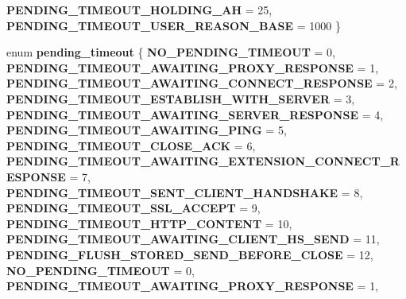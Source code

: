 \begin{DoxyCompactItemize}
{\bfseries P\+E\+N\+D\+I\+N\+G\+\_\+\+T\+I\+M\+E\+O\+U\+T\+\_\+\+H\+O\+L\+D\+I\+N\+G\+\_\+\+AH} = 25, 
\newline
{\bfseries P\+E\+N\+D\+I\+N\+G\+\_\+\+T\+I\+M\+E\+O\+U\+T\+\_\+\+U\+S\+E\+R\+\_\+\+R\+E\+A\+S\+O\+N\+\_\+\+B\+A\+SE} = 1000
 \}
\item 
\mbox{\label{group__timeout_ga2c0aa4b9c3c55bae7b35cbfac3246c87}} 
enum {\bfseries pending\+\_\+timeout} \{ \newline
{\bfseries N\+O\+\_\+\+P\+E\+N\+D\+I\+N\+G\+\_\+\+T\+I\+M\+E\+O\+UT} = 0, 
{\bfseries P\+E\+N\+D\+I\+N\+G\+\_\+\+T\+I\+M\+E\+O\+U\+T\+\_\+\+A\+W\+A\+I\+T\+I\+N\+G\+\_\+\+P\+R\+O\+X\+Y\+\_\+\+R\+E\+S\+P\+O\+N\+SE} = 1, 
{\bfseries P\+E\+N\+D\+I\+N\+G\+\_\+\+T\+I\+M\+E\+O\+U\+T\+\_\+\+A\+W\+A\+I\+T\+I\+N\+G\+\_\+\+C\+O\+N\+N\+E\+C\+T\+\_\+\+R\+E\+S\+P\+O\+N\+SE} = 2, 
{\bfseries P\+E\+N\+D\+I\+N\+G\+\_\+\+T\+I\+M\+E\+O\+U\+T\+\_\+\+E\+S\+T\+A\+B\+L\+I\+S\+H\+\_\+\+W\+I\+T\+H\+\_\+\+S\+E\+R\+V\+ER} = 3, 
\newline
{\bfseries P\+E\+N\+D\+I\+N\+G\+\_\+\+T\+I\+M\+E\+O\+U\+T\+\_\+\+A\+W\+A\+I\+T\+I\+N\+G\+\_\+\+S\+E\+R\+V\+E\+R\+\_\+\+R\+E\+S\+P\+O\+N\+SE} = 4, 
{\bfseries P\+E\+N\+D\+I\+N\+G\+\_\+\+T\+I\+M\+E\+O\+U\+T\+\_\+\+A\+W\+A\+I\+T\+I\+N\+G\+\_\+\+P\+I\+NG} = 5, 
{\bfseries P\+E\+N\+D\+I\+N\+G\+\_\+\+T\+I\+M\+E\+O\+U\+T\+\_\+\+C\+L\+O\+S\+E\+\_\+\+A\+CK} = 6, 
{\bfseries P\+E\+N\+D\+I\+N\+G\+\_\+\+T\+I\+M\+E\+O\+U\+T\+\_\+\+A\+W\+A\+I\+T\+I\+N\+G\+\_\+\+E\+X\+T\+E\+N\+S\+I\+O\+N\+\_\+\+C\+O\+N\+N\+E\+C\+T\+\_\+\+R\+E\+S\+P\+O\+N\+SE} = 7, 
\newline
{\bfseries P\+E\+N\+D\+I\+N\+G\+\_\+\+T\+I\+M\+E\+O\+U\+T\+\_\+\+S\+E\+N\+T\+\_\+\+C\+L\+I\+E\+N\+T\+\_\+\+H\+A\+N\+D\+S\+H\+A\+KE} = 8, 
{\bfseries P\+E\+N\+D\+I\+N\+G\+\_\+\+T\+I\+M\+E\+O\+U\+T\+\_\+\+S\+S\+L\+\_\+\+A\+C\+C\+E\+PT} = 9, 
{\bfseries P\+E\+N\+D\+I\+N\+G\+\_\+\+T\+I\+M\+E\+O\+U\+T\+\_\+\+H\+T\+T\+P\+\_\+\+C\+O\+N\+T\+E\+NT} = 10, 
{\bfseries P\+E\+N\+D\+I\+N\+G\+\_\+\+T\+I\+M\+E\+O\+U\+T\+\_\+\+A\+W\+A\+I\+T\+I\+N\+G\+\_\+\+C\+L\+I\+E\+N\+T\+\_\+\+H\+S\+\_\+\+S\+E\+ND} = 11, 
\newline
{\bfseries P\+E\+N\+D\+I\+N\+G\+\_\+\+F\+L\+U\+S\+H\+\_\+\+S\+T\+O\+R\+E\+D\+\_\+\+S\+E\+N\+D\+\_\+\+B\+E\+F\+O\+R\+E\+\_\+\+C\+L\+O\+SE} = 12, 
{\bfseries N\+O\+\_\+\+P\+E\+N\+D\+I\+N\+G\+\_\+\+T\+I\+M\+E\+O\+UT} = 0, 
{\bfseries P\+E\+N\+D\+I\+N\+G\+\_\+\+T\+I\+M\+E\+O\+U\+T\+\_\+\+A\+W\+A\+I\+T\+I\+N\+G\+\_\+\+P\+R\+O\+X\+Y\+\_\+\+R\+E\+S\+P\+O\+N\+SE} = 1, 

\end{DoxyCompactItemize}
